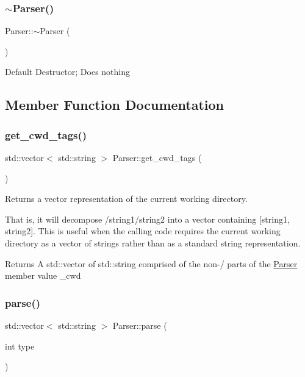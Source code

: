 \subsubsection{\texorpdfstring{$\sim$\+Parser()}{~Parser()}}
{\footnotesize\ttfamily Parser\+::$\sim$\+Parser (\begin{DoxyParamCaption}{ }\end{DoxyParamCaption})}

Default Destructor; Does nothing 

\subsection{Member Function Documentation}
\mbox{\label{classParser_aa973764b863dfbe448fa2fd7aa9ffdaa}} 
\subsubsection{\texorpdfstring{get\+\_\+cwd\+\_\+tags()}{get\_cwd\_tags()}}
{\footnotesize\ttfamily std\+::vector$<$ std\+::string $>$ Parser\+::get\+\_\+cwd\+\_\+tags (\begin{DoxyParamCaption}{ }\end{DoxyParamCaption})}



Returns a vector representation of the current working directory. 

That is, it will decompose \textquotesingle{}/string1/string2\textquotesingle{} into a vector containing \mbox{[}string1, string2\mbox{]}. This is useful when the calling code requires the current working directory as a vector of strings rather than as a standard string representation.

\begin{DoxyReturn}{Returns}
A std\+::vector of std\+::string comprised of the non-\/\textquotesingle{}/\textquotesingle{} parts of the \mbox{\hyperlink{classParser}{Parser}} member value \+\_\+cwd 
\end{DoxyReturn}
\mbox{\label{classParser_a5b531e9ed867eeb8ccb9cb088cf35c24}} 
\subsubsection{\texorpdfstring{parse()}{parse()}}
{\footnotesize\ttfamily std\+::vector$<$ std\+::string $>$ Parser\+::parse (\begin{DoxyParamCaption}\item[{int}]{type }\end{DoxyParamCaption})}




